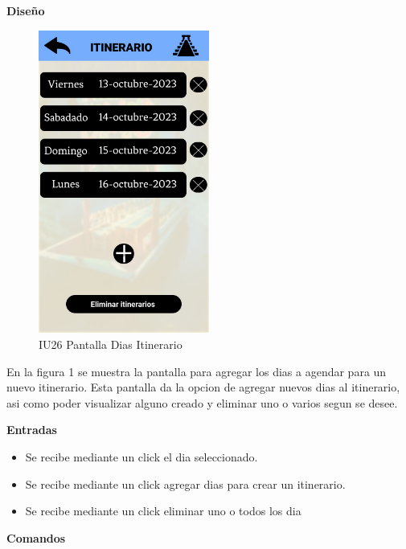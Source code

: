 \textbf{Diseño}\\
\begin{figure}[htbp]
    \centering 
    \includegraphics[width=0.5\textwidth]{Pantallas Prototipo3/IU26 Pantalla Dias Itinerario.jpg} 
    \caption{IU26 Pantalla Dias Itinerario} %
    \label{fig:Pantalla de itinerarios} %
\end{figure}

En la figura 1 se muestra la pantalla para agregar los dias a agendar para un nuevo itinerario. Esta pantalla da la opcion de agregar nuevos dias al itinerario, asi como poder visualizar alguno creado y eliminar uno o varios segun se desee.

\textbf{Entradas}\\
\begin{itemize}
    \item Se recibe mediante un click el dia seleccionado.

     \item Se recibe mediante un click agregar dias para crear un itinerario.\\
 \item Se recibe mediante un click eliminar uno o todos los dia \\
\end{itemize}

\textbf{Comandos}\\

